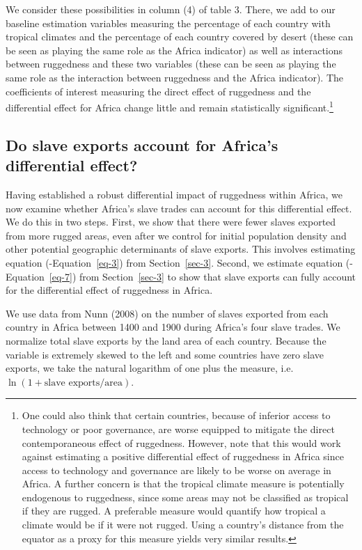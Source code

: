 \documentclass[
  letterpaper,
  DIV=11,
  numbers=noendperiod]{scrartcl}
\begin{document}
We consider these possibilities in column (4) of table 3. There, we add
to our baseline estimation variables measuring the percentage of each
country with tropical climates and the percentage of each country
covered by desert (these can be seen as playing the same role as the
Africa indicator) as well as interactions between ruggedness and these
two variables (these can be seen as playing the same role as the
interaction between ruggedness and the Africa indicator). The
coefficients of interest measuring the direct effect of ruggedness and
the differential effect for Africa change little and remain
statistically significant.\footnote{One could also think that certain
  countries, because of inferior access to technology or poor
  governance, are worse equipped to mitigate the direct contemporaneous
  effect of ruggedness. However, note that this would work against
  estimating a positive differential effect of ruggedness in Africa
  since access to technology and governance are likely to be worse on
  average in Africa. A further concern is that the tropical climate
  measure is potentially endogenous to ruggedness, since some areas may
  not be classified as tropical if they are rugged. A preferable measure
  would quantify how tropical a climate would be if it were not rugged.
  Using a country's distance from the equator as a proxy for this
  measure yields very similar results.}

\subsection{Do slave exports account for Africa's differential
effect?}\label{sec-5}

Having established a robust differential impact of ruggedness within
Africa, we now examine whether Africa's slave trades can account for
this differential effect. We do this in two steps. First, we show that
there were fewer slaves exported from more rugged areas, even after we
control for initial population density and other potential geographic
determinants of slave exports. This involves estimating equation
(-Equation~\ref{eq-3}) from Section~\ref{sec-3}. Second, we estimate
equation (-Equation~\ref{eq-7}) from Section~\ref{sec-3} to show that
slave exports can fully account for the differential effect of
ruggedness in Africa.

We use data from Nunn (2008) on the number of slaves exported from each
country in Africa between 1400 and 1900 during Africa's four slave
trades. We normalize total slave exports by the land area of each
country. Because the variable is extremely skewed to the left and some
countries have zero slave exports, we take the natural logarithm of one
plus the measure, i.e.~\(\ln(1 + \text{slave exports} / \text{area})\).
\end{document}
